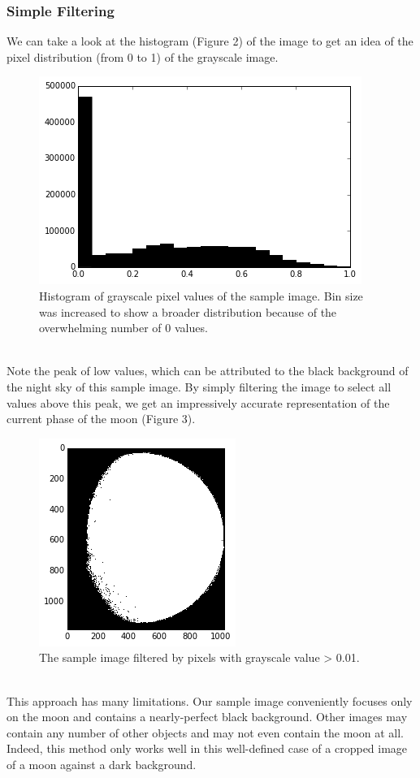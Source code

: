 \documentclass[]{article}
\begin{document}
\subsubsection*{Simple Filtering}
We can take a look at the histogram (Figure 2) of the image to get an idea of the pixel distribution (from 0 to 1) of the grayscale image.
\begin{figure}[h]
\centering
\includegraphics[scale=0.6]{hist}
\caption{Histogram of grayscale pixel values of the sample image. Bin size was increased  to show a broader distribution because of the overwhelming number of 0 values.}
\end{figure}
\pagebreak
\\
Note the peak of low values, which can be attributed to the black background of the night sky of this sample image. By simply filtering the image to select all values above this peak, we get an impressively accurate representation of the current phase of the moon (Figure 3).
\begin{figure}[h]
\centering
\includegraphics{moon_hist_filtered}
\caption{The sample image filtered by pixels with grayscale value > 0.01.}
\end{figure}
\\
This approach has many limitations. Our sample image conveniently focuses only on the moon and contains a nearly-perfect black background. Other images may contain any number of other objects and may not even contain the moon at all. Indeed, this method only works well in this well-defined case of a cropped image of a moon against a dark background.
\end{document}
